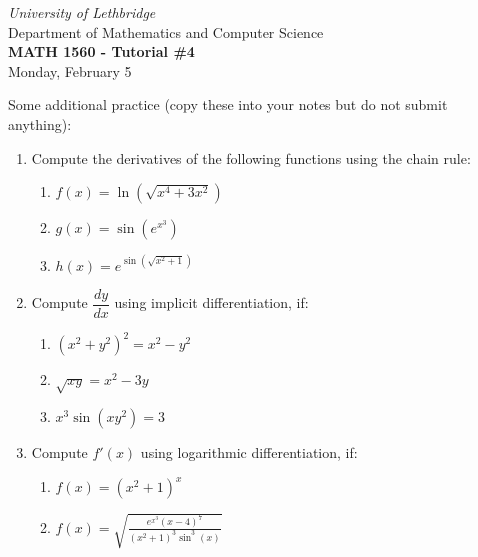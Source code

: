 \documentclass[12pt]{article}
\newcommand{\skipline}{\vspace{12pt}}
\newcommand{\di}{\displaystyle}
\begin{document}
\author{Instructor: Sean Fitzpatrick}
\thispagestyle{empty}
\begin{center}
\emph{University of Lethbridge}\\
Department of Mathematics and Computer Science\\
{\bf MATH 1560 - Tutorial \#4}\\
Monday, February 5
\end{center}
\skipline \skipline \skipline \noindent \skipline

\vspace*{\fill}



Some additional practice (copy these into your notes but do not submit anything):
\begin{enumerate}
\item Compute the derivatives of the following functions using the chain rule:
\begin{multicols}{3}
\begin{enumerate}
\item $f(x) = \ln(\sqrt{x^4+3x^2})$
\item $\di g(x) = \sin(e^{x^3})$
\item $\di h(x) = e^{\sin(\sqrt{x^2+1})}$ 
\end{enumerate}
\end{multicols}

\item Compute $\dfrac{dy}{dx}$ using implicit differentiation, if:
\begin{multicols}{3}
\begin{enumerate}
\item $(x^2+y^2)^2=x^2-y^2$
\item $\sqrt{xy}=x^2-3y$
\item $x^3\sin(xy^2)=3$
\end{enumerate}
\end{multicols}

\item Compute $f'(x)$ using logarithmic differentiation, if:
\begin{multicols}{2}
\begin{enumerate}
\item $\di f(x)=(x^2+1)^x$
\item $\di f(x)=\sqrt{\frac{e^{x^3}(x-4)^7}{(x^2+1)^3\sin^3(x)}}$
\end{enumerate}
\end{multicols}
\end{enumerate}
\end{document}
